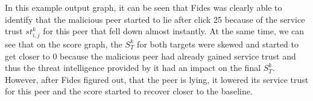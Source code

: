 In this example output graph, it can be seen that Fides was clearly able to identify that the malicious peer started to lie after click 25 because of the service trust $st^{k}_{i,j}$ for this peer that fell down almost instantly.
At the same time, we can see that on the score graph, the $S^{k}_{T}$ for both targets were skewed and started to get closer to $0$ because the malicious peer had already gained service trust and thus the threat intelligence provided by it had an impact on the final $S^{k}_{T}$.
However, after Fides figured out, that the peer is lying, it lowered its service trust for this peer and the score started to recover closer to the baseline.
